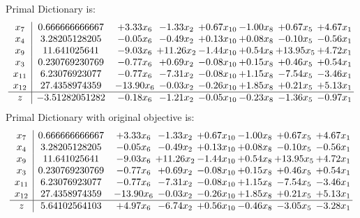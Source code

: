 \documentclass[8pt]{article}
\begin{document}
Primal Dictionary is:
\[\begin{array}{c| c c@{\hskip 2pt} c@{\hskip 2pt} c@{\hskip 2pt} c@{\hskip 2pt} c@{\hskip 2pt} c@{\hskip 2pt} }
 x_{7}   &  0.666666666667 & +  3.33 x_{6} & -1.33 x_{2} & +  0.67 x_{10} & -1.00 x_{8} & +  0.67 x_{5} & +  4.67 x_{1}\\
 x_{4}   &  3.28205128205 & -0.05 x_{6} & -0.49 x_{2} & +  0.13 x_{10} & +  0.08 x_{8} & -0.10 x_{5} & -0.56 x_{1}\\
 x_{9}   &  11.641025641 & -9.03 x_{6} & + 11.26 x_{2} & -1.44 x_{10} & +  0.54 x_{8} & + 13.95 x_{5} & +  4.72 x_{1}\\
 x_{3}   &  0.230769230769 & -0.77 x_{6} & +  0.69 x_{2} & -0.08 x_{10} & +  0.15 x_{8} & +  0.46 x_{5} & +  0.54 x_{1}\\
 x_{11}   &  6.23076923077 & -0.77 x_{6} & -7.31 x_{2} & -0.08 x_{10} & +  1.15 x_{8} & -7.54 x_{5} & -3.46 x_{1}\\
 x_{12}   &  27.4358974359 & -13.90 x_{6} & -0.03 x_{2} & -0.26 x_{10} & +  1.85 x_{8} & +  0.21 x_{5} & +  5.13 x_{1}\\
\hline
z    &  -3.51282051282 & -0.18 x_{6} & -1.21 x_{2} & -0.05 x_{10} & -0.23 x_{8} & -1.36 x_{5} & -0.97 x_{1}\\
\end{array}\]
Primal Dictionary with original objective is:
\[\begin{array}{c| c c@{\hskip 2pt} c@{\hskip 2pt} c@{\hskip 2pt} c@{\hskip 2pt} c@{\hskip 2pt} c@{\hskip 2pt} }
 x_{7}   &  0.666666666667 & +  3.33 x_{6} & -1.33 x_{2} & +  0.67 x_{10} & -1.00 x_{8} & +  0.67 x_{5} & +  4.67 x_{1}\\
 x_{4}   &  3.28205128205 & -0.05 x_{6} & -0.49 x_{2} & +  0.13 x_{10} & +  0.08 x_{8} & -0.10 x_{5} & -0.56 x_{1}\\
 x_{9}   &  11.641025641 & -9.03 x_{6} & + 11.26 x_{2} & -1.44 x_{10} & +  0.54 x_{8} & + 13.95 x_{5} & +  4.72 x_{1}\\
 x_{3}   &  0.230769230769 & -0.77 x_{6} & +  0.69 x_{2} & -0.08 x_{10} & +  0.15 x_{8} & +  0.46 x_{5} & +  0.54 x_{1}\\
 x_{11}   &  6.23076923077 & -0.77 x_{6} & -7.31 x_{2} & -0.08 x_{10} & +  1.15 x_{8} & -7.54 x_{5} & -3.46 x_{1}\\
 x_{12}   &  27.4358974359 & -13.90 x_{6} & -0.03 x_{2} & -0.26 x_{10} & +  1.85 x_{8} & +  0.21 x_{5} & +  5.13 x_{1}\\
\hline
z    &  5.64102564103 & +  4.97 x_{6} & -6.74 x_{2} & +  0.56 x_{10} & -0.46 x_{8} & -3.05 x_{5} & -3.28 x_{1}\\
\end{array}\]
\end{document}
